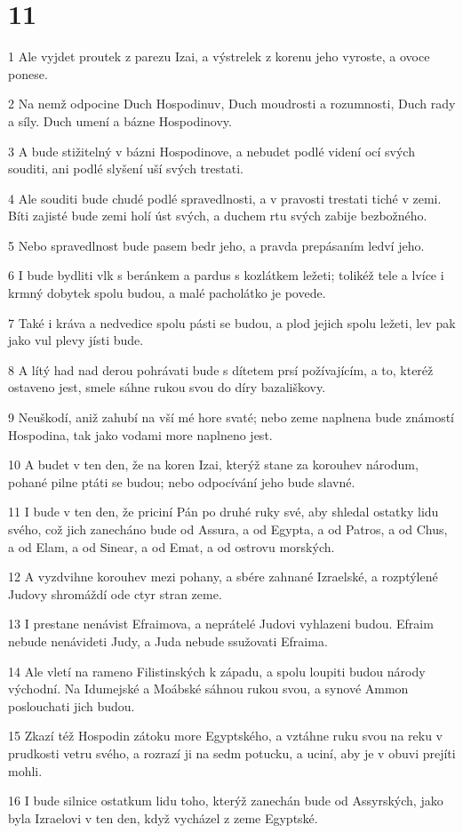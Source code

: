 \chapter{11}

\par 1 Ale vyjdet proutek z parezu Izai, a výstrelek z korenu jeho vyroste, a ovoce ponese.
\par 2 Na nemž odpocine Duch Hospodinuv, Duch moudrosti a rozumnosti, Duch rady a síly. Duch umení a bázne Hospodinovy.
\par 3 A bude stižitelný v bázni Hospodinove, a nebudet podlé videní ocí svých souditi, ani podlé slyšení uší svých trestati.
\par 4 Ale souditi bude chudé podlé spravedlnosti, a v pravosti trestati tiché v zemi. Bíti zajisté bude zemi holí úst svých, a duchem rtu svých zabije bezbožného.
\par 5 Nebo spravedlnost bude pasem bedr jeho, a pravda prepásaním ledví jeho.
\par 6 I bude bydliti vlk s beránkem a pardus s kozlátkem ležeti; tolikéž tele a lvíce i krmný dobytek spolu budou, a malé pacholátko je povede.
\par 7 Také i kráva a nedvedice spolu pásti se budou, a plod jejich spolu ležeti, lev pak jako vul plevy jísti bude.
\par 8 A lítý had nad derou pohrávati bude s dítetem prsí požívajícím, a to, kteréž ostaveno jest, smele sáhne rukou svou do díry bazališkovy.
\par 9 Neuškodí, aniž zahubí na vší mé hore svaté; nebo zeme naplnena bude známostí Hospodina, tak jako vodami more naplneno jest.
\par 10 A budet v ten den, že na koren Izai, kterýž stane za korouhev národum, pohané pilne ptáti se budou; nebo odpocívání jeho bude slavné.
\par 11 I bude v ten den, že priciní Pán po druhé ruky své, aby shledal ostatky lidu svého, což jich zanecháno bude od Assura, a od Egypta, a od Patros, a od Chus, a od Elam, a od Sinear, a od Emat, a od ostrovu morských.
\par 12 A vyzdvihne korouhev mezi pohany, a sbére zahnané Izraelské, a rozptýlené Judovy shromáždí ode ctyr stran zeme.
\par 13 I prestane nenávist Efraimova, a neprátelé Judovi vyhlazeni budou. Efraim nebude nenávideti Judy, a Juda nebude ssužovati Efraima.
\par 14 Ale vletí na rameno Filistinských k západu, a spolu loupiti budou národy východní. Na Idumejské a Moábské sáhnou rukou svou, a synové Ammon poslouchati jich budou.
\par 15 Zkazí též Hospodin zátoku more Egyptského, a vztáhne ruku svou na reku v prudkosti vetru svého, a rozrazí ji na sedm potucku, a uciní, aby je v obuvi prejíti mohli.
\par 16 I bude silnice ostatkum lidu toho, kterýž zanechán bude od Assyrských, jako byla Izraelovi v ten den, když vycházel z zeme Egyptské.

